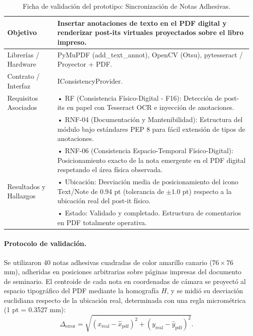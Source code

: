\begin{table}[H]
    \centering
    \caption{Ficha de validación del prototipo: Sincronización de Notas Adhesivas.}
    \label{tab:ficha_f16}
    \begin{tabular}{L{3.2cm} L{11.0cm}}
        \toprule
        Objetivo & Insertar anotaciones de texto en el PDF digital y renderizar post-its virtuales proyectados sobre el libro impreso. \\ \midrule
        Librerías / Hardware & PyMuPDF (add\_text\_annot), OpenCV (Otsu), pytesseract / Proyector + PDF. \\ \midrule
        Contrato / Interfaz & IConsistencyProvider. \\ \midrule
        Requisitos Asociados &
        • RF (Consistencia Físico-Digital - F16): Detección de post-its en papel con Tesseract OCR e inyección de anotaciones. \vspace{0.1cm} \\
        & • RNF-04 (Documentación y Mantenibilidad): Estructura del módulo bajo estándares PEP 8 para fácil extensión de tipos de anotaciones. \vspace{0.1cm} \\
        & • RNF-06 (Consistencia Espacio-Temporal Físico-Digital): Posicionamiento exacto de la nota emergente en el PDF digital respetando el área física observada. \\ \midrule
        Resultados y Hallazgos &
        • Ubicación: Desviación media de posicionamiento del icono Text/Note de 0.94 pt (tolerancia de $\pm1.0$ pt) respecto a la ubicación real del post-it físico. \vspace{0.1cm} \\
        & • Estado: Validado y completado. Estructura de comentarios en PDF totalmente operativa. \\ \bottomrule
    \end{tabular}
\end{table}
 
\paragraph{Protocolo de validación.} Se utilizaron 40 notas adhesivas cuadradas de color amarillo canario ($76 \times 76$ mm), adheridas en posiciones arbitrarias sobre páginas impresas del documento de seminario. El centroide de cada nota en coordenadas de cámara se proyectó al espacio tipográfico del PDF mediante la homografía $H$, y se midió su desviación euclidiana respecto de la ubicación real, determinada con una regla micrométrica (1 pt = 0.3527 mm):
\[ \Delta_{\mathrm{error}} = \sqrt{(x_{\mathrm{real}} - \hat{x}_{\mathrm{pdf}})^2 + (y_{\mathrm{real}} - \hat{y}_{\mathrm{pdf}})^2}. \]
 
